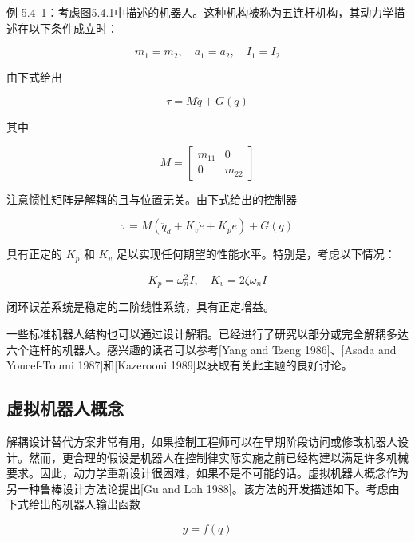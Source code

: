 \documentclass[UTF8,12pt,a4paper]{ctexart}
\begin{document}
\begin{example}[解耦设计]
例 5.4--1：考虑图5.4.1中描述的机器人。这种机构被称为五连杆机构，其动力学描述在以下条件成立时：

\begin{equation}
m_1 = m_2, \quad a_1 = a_2, \quad I_1 = I_2
\end{equation}

由下式给出

\begin{equation}
\tau = M\ddot{q} + G(q)
\end{equation}

其中

\begin{equation}
M = \begin{bmatrix} m_{11} & 0 \\ 0 & m_{22} \end{bmatrix}
\end{equation}

注意惯性矩阵是解耦的且与位置无关。由下式给出的控制器

\begin{equation}
\tau = M(\ddot{q}_d + K_v \dot{e} + K_p e) + G(q)
\end{equation}

具有正定的 $K_p$ 和 $K_v$ 足以实现任何期望的性能水平。特别是，考虑以下情况：

\begin{equation}
K_p = \omega_n^2 I, \quad K_v = 2\zeta\omega_n I
\end{equation}

闭环误差系统是稳定的二阶线性系统，具有正定增益。
\end{example}

一些标准机器人结构也可以通过设计解耦。已经进行了研究以部分或完全解耦多达六个连杆的机器人。感兴趣的读者可以参考[Yang and Tzeng 1986]、[Asada and Youcef-Toumi 1987]和[Kazerooni 1989]以获取有关此主题的良好讨论。

\subsection{虚拟机器人概念}

解耦设计替代方案非常有用，如果控制工程师可以在早期阶段访问或修改机器人设计。然而，更合理的假设是机器人在控制律实际实施之前已经构建以满足许多机械要求。因此，动力学重新设计很困难，如果不是不可能的话。虚拟机器人概念作为另一种鲁棒设计方法论提出[Gu and Loh 1988]。该方法的开发描述如下。考虑由下式给出的机器人输出函数

\begin{equation}\label{eq:5.4.1}
y = f(q)
\end{equation}
\end{document}

